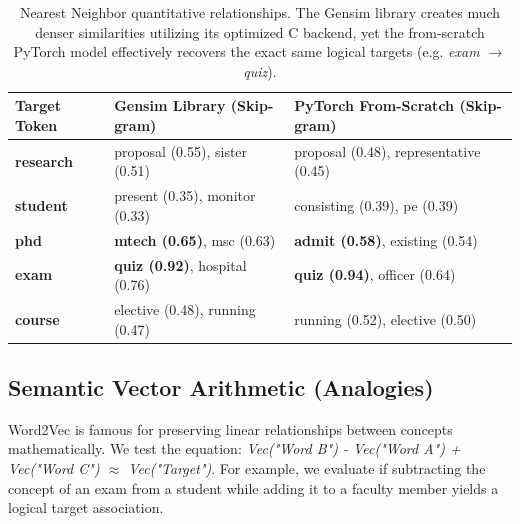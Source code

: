 \documentclass[11pt,a4paper]{article}
\begin{document}
\begin{table}[H]
    \centering
    \renewcommand{\arraystretch}{1.4}
    \begin{tabular}{@{} p{2.0cm} p{6.5cm} p{6.5cm} @{}}
        \toprule
        \textbf{\color{iitjblue} Target Token} & \textbf{\color{iitjblue} Gensim Library (Skip-gram)} & \textbf{\color{iitjblue} PyTorch From-Scratch (Skip-gram)} \\
        \midrule
        \textbf{research} & proposal (0.55), sister (0.51) & proposal (0.48), representative (0.45) \\
        \rowcolor{black!5} \textbf{student} & present (0.35), monitor (0.33) & consisting (0.39), pe (0.39) \\
        \textbf{phd} & \textcolor{accentgreen}{\textbf{mtech (0.65)}}, msc (0.63) & \textcolor{accentgreen}{\textbf{admit (0.58)}}, existing (0.54) \\
        \rowcolor{black!5} \textbf{exam} & \textcolor{accentgreen}{\textbf{quiz (0.92)}}, hospital (0.76) & \textcolor{accentgreen}{\textbf{quiz (0.94)}}, officer (0.64) \\
        \textbf{course} & elective (0.48), running (0.47) & running (0.52), elective (0.50) \\
        \bottomrule
    \end{tabular}
    \vspace{0.5em}
    \caption{Nearest Neighbor quantitative relationships. The Gensim library creates much denser similarities utilizing its optimized C backend, yet the from-scratch PyTorch model effectively recovers the exact same logical targets (e.g. \textit{exam $\rightarrow$ quiz}).}
    \label{tab:neighbors}
\end{table}

\subsection{Semantic Vector Arithmetic (Analogies)}
Word2Vec is famous for preserving linear relationships between concepts mathematically. We test the equation: \textit{Vec("Word B") - Vec("Word A") + Vec("Word C") $\approx$ Vec("Target")}. For example, we evaluate if subtracting the concept of an exam from a student while adding it to a faculty member yields a logical target association.
\end{document}
